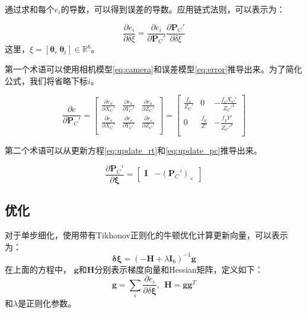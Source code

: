通过求和每个$e_i$的导数，可以得到误差的导数。应用链式法则，可以表示为：

\begin{equation}
    \frac{\partial e_i}{\partial \delta \xi}=
\frac{\partial e_i}{\partial \mathbf{P}_C'} \frac{\partial \mathbf{P}_C'}{\partial \delta \xi}
\label{eq:dedxi}
\end{equation}
这里，$\xi=[\mathbf{\theta}_r \  \mathbf{\theta}_t] \in \mathbb{R}^6$。

第一个术语可以使用相机模型\autoref{eq:camera}和误差模型\autoref{eq:error}推导出来。为了简化公式，我们将省略下标$i$。

\begin{equation}
\frac{\partial e}{\partial \mathbf{P}_C'}=
\begin{bmatrix}
\frac{\partial r_{u}}{\partial X_C'}&\frac{\partial r_{u}}{\partial Y_C'}&\frac{\partial r_{u}}{\partial Z_C'}\\[5pt]\frac{\partial r_{v}}{\partial X_C'}&\frac{\partial r_{v}}{\partial Y_C'}&\frac{\partial r_{v}}{\partial Z_C'}\\ 
\end{bmatrix}
=
\begin{bmatrix}\frac{f_x}{Z_C'}&0&-\frac{f_x X_C'}{Z_C'^{2}}\\0&\frac{f_y}{Z'}&-\frac{f_y Y'}{Z_C'^{2}}\\ 
\end{bmatrix}
\label{eq:dedPC}
\end{equation}

第二个术语可以从更新方程\autoref{eq:update_rt}和\autoref{eq:update_pc}推导出来。

\begin{equation}
    \frac{\partial \mathbf{P}_C'}{\partial \mathbf{\xi}}=
\begin{bmatrix}
\mathbf{I} & -(\mathbf{P}_C')_{\times}
\end{bmatrix}
\label{eq:dPCdxi}
\end{equation}

\subsection{优化}

对于单步细化，使用带有Tikhonov正则化的牛顿优化计算更新向量，可以表示为：
\begin{equation}
\mathbf{\delta \xi} = 
  \left( 
    -\mathbf{H} + 
    \lambda \mathbf{I}_{6}
  \right)^{-1}\mathbf{g}
\label{eq:delta_si}
\end{equation}
在上面的方程中，
$\mathbf{g}$和$\mathbf{H}$分别表示梯度向量和Hessian矩阵，定义如下：
\begin{equation}
    \mathbf{g} = \sum_{i}\frac{\partial e_i}{\partial \delta \mathbf{\xi}}, \ \ \mathbf{H} = \mathbf{g} \mathbf{g}^T
\label{eq:gH}
\end{equation}
和$\lambda$是正则化参数。

